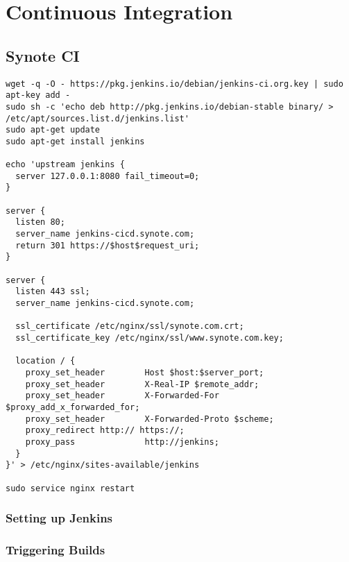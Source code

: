 \chapter{Continuous Integration}
\label{chap:continuous-integration}

\section{Synote CI}
\label{sec:synote-ci}

\begin{listing}[H]
\begin{verbatim}
wget -q -O - https://pkg.jenkins.io/debian/jenkins-ci.org.key | sudo apt-key add -
sudo sh -c 'echo deb http://pkg.jenkins.io/debian-stable binary/ > /etc/apt/sources.list.d/jenkins.list'
sudo apt-get update
sudo apt-get install jenkins

echo 'upstream jenkins {
  server 127.0.0.1:8080 fail_timeout=0;
}

server {
  listen 80;
  server_name jenkins-cicd.synote.com;
  return 301 https://$host$request_uri;
}

server {
  listen 443 ssl;
  server_name jenkins-cicd.synote.com;

  ssl_certificate /etc/nginx/ssl/synote.com.crt;
  ssl_certificate_key /etc/nginx/ssl/www.synote.com.key;

  location / {
    proxy_set_header        Host $host:$server_port;
    proxy_set_header        X-Real-IP $remote_addr;
    proxy_set_header        X-Forwarded-For $proxy_add_x_forwarded_for;
    proxy_set_header        X-Forwarded-Proto $scheme;
    proxy_redirect http:// https://;
    proxy_pass              http://jenkins;
  }
}' > /etc/nginx/sites-available/jenkins

sudo service nginx restart

\end{verbatim}
\label{listing:3}
\end{listing}

\subsection{Setting up Jenkins}
\label{subsec:setting-up-jenkins}

\subsection{Triggering Builds}
\label{subsec:triggering-builds}

